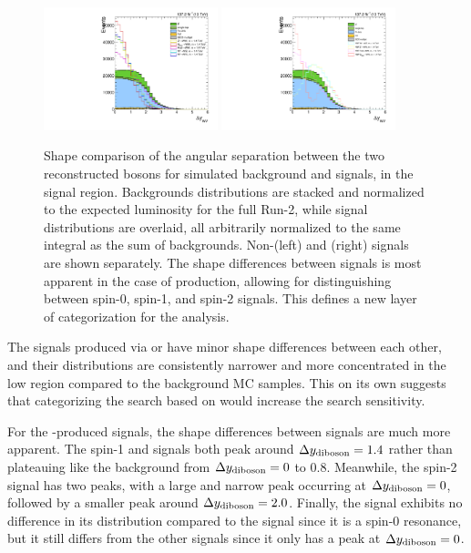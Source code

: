 \begin{figure}[htbp]
  \centering
  \includegraphics[width=0.45\textwidth]{fig/eventSelection/SR_b1_allL_allP_allC_inc_lo_Run2_Dy.pdf}
  \includegraphics[width=0.45\textwidth]{fig/eventSelection/SR_b1_allL_allP_allC_vbf_lo_Run2_Dy.pdf}
  \caption{
    Shape comparison of the angular separation \Dy between the two reconstructed bosons for simulated background and signals, in the signal region.
    Backgrounds distributions are stacked and normalized to the expected luminosity for the full Run-2, while signal distributions are overlaid, all arbitrarily normalized to the same integral as the sum of backgrounds.
    Non-\VBF (left) and \VBF (right) signals are shown separately.
    The shape differences between signals is most apparent in the case of \VBF production, allowing for distinguishing between spin-0, spin-1, and spin-2 signals.
    This defines a new layer of categorization for the analysis.
  }
  \label{fig:DyComp}
\end{figure}

The signals produced via \ggF or \DY have minor shape differences between each other, and their distributions are consistently narrower and more concentrated in the low \Dy region compared to the background MC samples.
This on its own suggests that categorizing the search based on \Dy would increase the search sensitivity.

For the \VBF-produced signals, the shape differences between signals are much more apparent.
The spin-1 \VBF\WprtoWZ and \ZprtoWW signals both peak around $\Delta y_\mathrm{diboson}=1.4$ rather than plateauing like the background from $\Delta y_\mathrm{diboson}=0$ to 0.8.
Meanwhile, the spin-2 \VBF\GBulktoWW signal has two peaks, with a large and narrow peak occurring at $\Delta y_\mathrm{diboson}=0$, followed by a smaller peak around $\Delta y_\mathrm{diboson}=2.0$.
Finally, the \VBF\RadtoWW signal exhibits no difference in its \Dy distribution compared to the \ggF\RadtoWW signal since it is a spin-0 resonance, but it still differs from the other \VBF signals since it only has a peak at $\Delta y_\mathrm{diboson}=0$.

